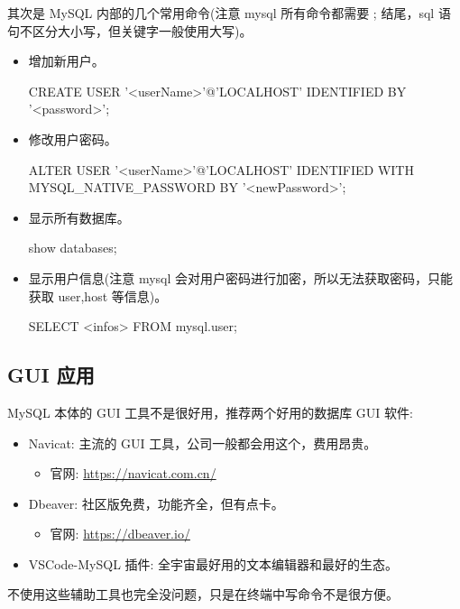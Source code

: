 其次是 MySQL 内部的几个常用命令(注意 mysql 所有命令都需要 ; 结尾，sql 语句不区分大小写，但关键字一般使用大写)。

\begin{itemize}
    \item 增加新用户。
\begin{sql}
CREATE USER '<userName>'@'LOCALHOST' IDENTIFIED BY '<password>';
\end{sql}
    \item 修改用户密码。
\begin{sql}
ALTER USER '<userName>'@'LOCALHOST' IDENTIFIED WITH MYSQL_NATIVE_PASSWORD BY '<newPassword>';
\end{sql}
    \item 显示所有数据库。
\begin{sql}
show databases;
\end{sql}
    \item 显示用户信息(注意 mysql 会对用户密码进行加密，所以无法获取密码，只能获取 user,host 等信息)。
\begin{sql}
SELECT <infos> FROM mysql.user;
\end{sql}
\end{itemize}

\subsection{GUI 应用}

MySQL 本体的 GUI 工具不是很好用，推荐两个好用的数据库 GUI 软件:

\begin{itemize}
    \item Navicat: 主流的 GUI 工具，公司一般都会用这个，费用昂贵。
    \begin{itemize}
        \item 官网: \url{https://navicat.com.cn/}
    \end{itemize}
    \item Dbeaver: 社区版免费，功能齐全，但有点卡。
    \begin{itemize}
        \item 官网: \url{https://dbeaver.io/}
    \end{itemize}
    \item VSCode-MySQL 插件: 全宇宙最好用的文本编辑器和最好的生态。
\end{itemize}

不使用这些辅助工具也完全没问题，只是在终端中写命令不是很方便。

\newpage